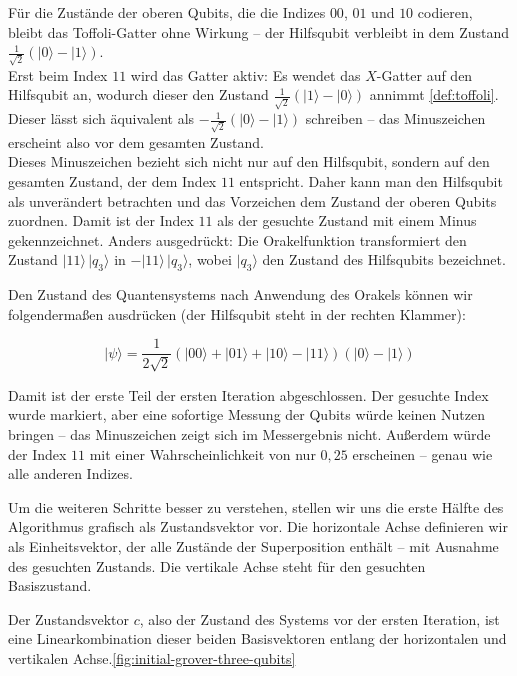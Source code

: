  Für die Zustände der oberen Qubits, die die Indizes $00$, $01$ und $10$ codieren, bleibt das Toffoli-Gatter ohne Wirkung – der Hilfsqubit verbleibt in dem Zustand $\frac{1}{\sqrt{2}}(|0\rangle - |1\rangle)$.\\

 Erst beim Index $11$ wird das Gatter aktiv: Es wendet das $X$-Gatter auf den Hilfsqubit an, wodurch dieser den Zustand $\frac{1}{\sqrt{2}}(|1\rangle - |0\rangle)$ annimmt \ref{def:toffoli}. Dieser lässt sich äquivalent als $-\frac{1}{\sqrt{2}}(|0\rangle - |1\rangle)$ schreiben – das Minuszeichen erscheint also vor dem gesamten Zustand.\\

 Dieses Minuszeichen bezieht sich nicht nur auf den Hilfsqubit, sondern auf den gesamten Zustand, der dem Index $11$ entspricht. Daher kann man den Hilfsqubit als unverändert betrachten und das Vorzeichen dem Zustand der oberen Qubits zuordnen. Damit ist der Index $11$ als der gesuchte Zustand mit einem Minus gekennzeichnet. Anders ausgedrückt: Die Orakelfunktion transformiert den Zustand $|11\rangle\,|q_{\text{3}}\rangle$ in $-|11\rangle\,|q_{\text{3}}\rangle$, wobei $|q_{\text{3}}\rangle$ den Zustand des Hilfsqubits bezeichnet.

Den Zustand des Quantensystems nach Anwendung des Orakels können wir folgendermaßen ausdrücken (der Hilfsqubit steht in der rechten Klammer):

$$
|\psi\rangle = \frac{1}{2\sqrt{2}} (|00\rangle + |01\rangle + |10\rangle - |11\rangle)(|0\rangle - |1\rangle)
$$

Damit ist der erste Teil der ersten Iteration abgeschlossen. Der gesuchte Index wurde markiert, aber eine sofortige Messung der Qubits würde keinen Nutzen bringen – das Minuszeichen zeigt sich im Messergebnis nicht. Außerdem würde der Index $11$ mit einer Wahrscheinlichkeit von nur $0{,}25$ erscheinen – genau wie alle anderen Indizes.

Um die weiteren Schritte besser zu verstehen, stellen wir uns die erste Hälfte des Algorithmus grafisch als Zustandsvektor vor. Die horizontale Achse definieren wir als Einheitsvektor, der alle Zustände der Superposition enthält – mit Ausnahme des gesuchten Zustands. Die vertikale Achse steht für den gesuchten Basiszustand.

Der Zustandsvektor $c$, also der Zustand des Systems vor der ersten Iteration, ist eine Linearkombination dieser beiden Basisvektoren entlang der horizontalen und vertikalen Achse.\ref{fig:initial-grover-three-qubits}

